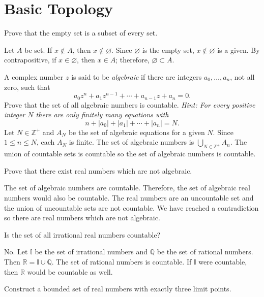 \chapter{Basic Topology}
\label{ch2}

\begin{exercise}
\item
  Prove that the empty set is a subset of every set.
  \par\smallskip
  Let \(A\) be set.
  If \(x\not\in A\), then \(x\not\in\varnothing\).
  Since \(\varnothing\) is the empty set, \(x\not\in\varnothing\) is a given.
  By contrapositive, if \(x\in\varnothing\), then \(x\in A\); therefore,
  \(\varnothing\subset A\).
\item
  A complex number \(z\) is said to be \textit{algebraic} if there are integers
  \(a_0,\ldots,a_n\), not all zero, such that
  \[
  a_0z^n + a_1z^{n - 1} + \cdots + a_{n - 1}z + a_n = 0.
  \]
  Prove that the set of all algebraic numbers is countable.
  \textit{Hint: For every positive integer \(N\) there are only finitely many
    equations with}
  \[
  n + \lvert a_0\rvert + \lvert a_1\rvert + \cdots + \lvert a_n\rvert = N.
  \]
  Let \(N\in\mathbb{Z}^+\) and \(A_N\) be the set of algebraic equations for a
  given \(N\).
  Since \(1\leq n\leq N\), each \(A_N\) is finite.
  The set of algebraic numbers is \(\bigcup_{N\in\mathbb{Z}^+}A_n\).
  The union of countable sets is countable so the set of algebraic numbers is
  countable.
\item
  Prove that there exist real numbers which are not algebraic.
  \par\smallskip
  The set of algebraic numbers are countable.
  Therefore, the set of algebraic real numbers would also be countable.
  The real numbers are an uncountable set and the union of uncountable sets are
  not countable. We have reached a contradiction so there are real numbers which
  are not algebraic.
\item
  Is the set of all irrational real numbers countable?
  \par\smallskip
  No.
  Let \(\mathbb{I}\) be the set of irrational numbers and \(\mathbb{Q}\) be the
  set of rational numbers.
  Then \(\mathbb{R} = \mathbb{I}\cup\mathbb{Q}\).
  The set of rational numbers is countable.
  If \(\mathbb{I}\) were countable, then \(\mathbb{R}\) would be countable as
  well.
\item
  Construct a bounded set of real numbers with exactly three limit points.
  \par\smallskip

\end{exercise}
